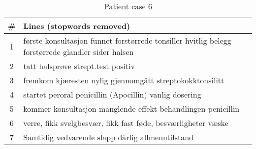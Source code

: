 \begin{table}[htbp] \footnotesize \center
\caption[]{Patient case 6\label{tab:case6}}
\begin{tabularx}{\textwidth}{c X}
    \toprule
    \# & Lines (stopwords removed) \\
    \midrule
    1 & første konsultasjon funnet forstørrede tonsiller hvitlig belegg forstørrede glandler sider halsen \\
    2 & tatt halsprøve strept.test positiv \\
    3 & fremkom kjæresten nylig gjennomgått streptokokktonsilitt \\
    4 & startet peroral penicillin (Apocillin) vanlig dosering \\
    5 & kommer konsultasjon manglende effekt behandlingen penicillin \\
    6 & verre, fikk svelgbesvær, fikk fast føde, besværligheter væske \\
    7 & Samtidig vedvarende slapp dårlig allmenntilstand \\
    \bottomrule
\end{tabularx}
\end{table}

